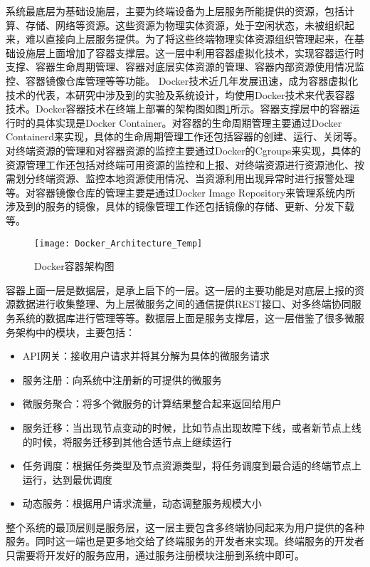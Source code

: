 系统最底层为基础设施层，主要为终端设备为上层服务所能提供的资源，包括计算、存储、网络等资源。这些资源为物理实体资源，处于空闲状态，未被组织起来，难以直接向上层服务提供。为了将这些终端物理实体资源组织管理起来，在基础设施层上面增加了容器支撑层。这一层中利用容器虚拟化技术，实现容器运行时支撑、容器生命周期管理、容器对底层实体资源的管理、容器内部资源使用情况监控、容器镜像仓库管理等等功能。
Docker技术近几年发展迅速，成为容器虚拟化技术的代表，本研究中涉及到的实验及系统设计，均使用Docker技术来代表容器技术。Docker容器技术在终端上部署的架构图如图\ref{fig:docker_architecture}所示。容器支撑层中的容器运行时的具体实现是Docker Container。对容器的生命周期管理主要通过Docker Containerd来实现，具体的生命周期管理工作还包括容器的创建、运行、关闭等。对终端资源的管理和对容器资源的监控主要通过Docker的Cgroups来实现，具体的资源管理工作还包括对终端可用资源的监控和上报、对终端资源进行资源池化、按需划分终端资源、监控本地资源使用情况、当资源利用出现异常时进行报警处理等。对容器镜像仓库的管理主要是通过Docker Image Repository来管理系统内所涉及到的服务的镜像，具体的镜像管理工作还包括镜像的存储、更新、分发下载等。
\begin{figure}[!htbp]
    \centering
    \texttt{[image: Docker\_Architecture\_Temp]}
    \caption{Docker容器架构图}
    \label{fig:docker_architecture}
\end{figure}

容器上面一层是数据层，是承上启下的一层。这一层的主要功能是对底层上报的资源数据进行收集整理、为上层微服务之间的通信提供REST接口、对多终端协同服务系统的数据库进行管理等等。数据层上面是服务支撑层，这一层借鉴了很多微服务架构中的模块，主要包括：
\begin{itemize}
    \item API网关：接收用户请求并将其分解为具体的微服务请求
    \item 服务注册：向系统中注册新的可提供的微服务
    \item 微服务聚合：将多个微服务的计算结果整合起来返回给用户
    \item 服务迁移：当出现节点变动的时候，比如节点出现故障下线，或者新节点上线的时候，将服务迁移到其他合适节点上继续运行
    \item 任务调度：根据任务类型及节点资源类型，将任务调度到最合适的终端节点上运行，达到最优调度
    \item 动态服务：根据用户请求流量，动态调整服务规模大小
\end{itemize}

整个系统的最顶层则是服务层，这一层主要包含多终端协同起来为用户提供的各种服务。同时这一端也是更多地交给了终端服务的开发者来实现。终端服务的开发者只需要将开发好的服务应用，通过服务注册模块注册到系统中即可。

